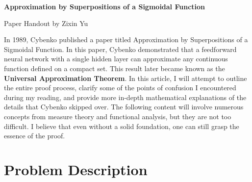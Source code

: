 \documentclass[12pt]{article}
\begin{document}
\begin{center}
\begin{large}
\textbf{Approximation by Superpositions of a Sigmoidal Function}\\
\end{large}
Paper Handout by Zixin Yu
\end{center}

In 1989, Cybenko published a paper titled Approximation by Superpositions of a Sigmoidal Function. In this paper, Cybenko demonstrated that a feedforward neural network with a single hidden layer can approximate any continuous function defined on a compact set. This result later became known as the \textbf{Universal Approximation Theorem}. In this article, I will attempt to outline the entire proof process, clarify some of the points of confusion I encountered during my reading, and provide more in-depth mathematical explanations of the details that Cybenko skipped over. The following content will involve numerous concepts from measure theory and functional analysis, but they are not too difficult. I believe that even without a solid foundation, one can still grasp the essence of the proof.

\section{Problem Description}

\begin{figure}[H]
    \centering
{}
\end{figure}
\end{document}
